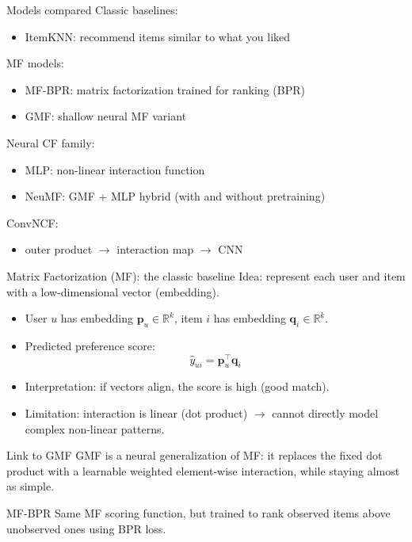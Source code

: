 \documentclass[aspectratio=169,11pt]{beamer}
\begin{document}
\begin{frame}{Models compared}
Classic baselines:
\begin{itemize}
  \item ItemKNN: recommend items similar to what you liked
\end{itemize}
MF models:
\begin{itemize}
   \item MF-BPR: matrix factorization trained for ranking (BPR)
     \item GMF: shallow neural MF variant
\end{itemize}
\medgap
Neural CF family:
\begin{itemize}

  \item MLP: non-linear interaction function
  \item NeuMF: GMF + MLP hybrid (with and without pretraining)
\end{itemize}

\medgap
ConvNCF:
\begin{itemize}
  \item outer product $\rightarrow$ interaction map $\rightarrow$ CNN
\end{itemize}
\end{frame}


\begin{frame}{Matrix Factorization (MF): the classic baseline}
Idea: represent each user and item with a low-dimensional vector (embedding).

\medgap
\begin{itemize}
  \item User $u$ has embedding $\mathbf{p}_u \in \mathbb{R}^k$, item $i$ has embedding $\mathbf{q}_i \in \mathbb{R}^k$.
  \item Predicted preference score:
  \[
    \hat{y}_{ui} = \mathbf{p}_u^\top \mathbf{q}_i
  \]
  \item Interpretation: if vectors align, the score is high (good match).
  \item Limitation: interaction is linear (dot product) $\rightarrow$ cannot directly model complex non-linear patterns.
\end{itemize}

\medgap
\begin{block}{Link to GMF}
GMF is a neural generalization of MF: it replaces the fixed dot product with a learnable weighted element-wise interaction, while staying almost as simple.
\end{block}
\medgap
\begin{block}{MF-BPR}
Same MF scoring function, but trained to rank observed items above unobserved ones using BPR loss.
\end{block}
\end{frame}
\end{document}
